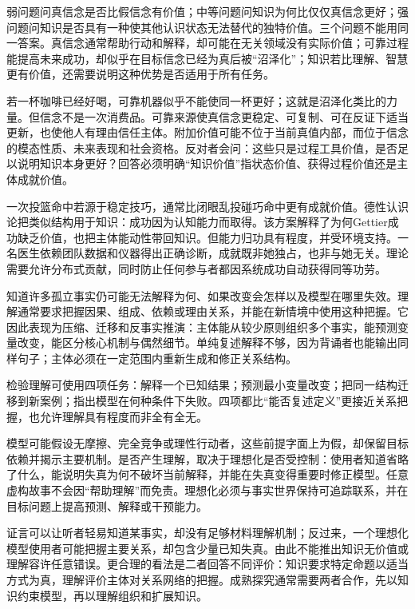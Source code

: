 弱问题问真信念是否比假信念有价值；中等问题问知识为何比仅仅真信念更好；强问题问知识是否具有一种使其他认识状态无法替代的独特价值。三个问题不能用同一答案。真信念通常帮助行动和解释，却可能在无关领域没有实际价值；可靠过程能提高未来成功，却似乎在目标信念已经为真后被“沼泽化”；知识若比理解、智慧更有价值，还需要说明这种优势是否适用于所有任务。

若一杯咖啡已经好喝，可靠机器似乎不能使同一杯更好；这就是沼泽化类比的力量。但信念不是一次消费品。可靠来源使真信念更稳定、可复制、可在反证下适当更新，也使他人有理由信任主体。附加价值可能不位于当前真值内部，而位于信念的模态性质、未来表现和社会资格。反对者会问：这些只是过程工具价值，是否足以说明知识本身更好？回答必须明确“知识价值”指状态价值、获得过程价值还是主体成就价值。

一次投篮命中若源于稳定技巧，通常比闭眼乱投碰巧命中更有成就价值。德性认识论把类似结构用于知识：成功因为认知能力而取得\parencite{sosa2007,zagzebski1996}。该方案解释了为何Gettier成功缺乏价值，也把主体能动性带回知识。但能力归功具有程度，并受环境支持。一名医生依赖团队数据和仪器得出正确诊断，成就既非她独占，也非与她无关。理论需要允许分布式贡献，同时防止任何参与者都因系统成功自动获得同等功劳。

知道许多孤立事实仍可能无法解释为何、如果改变会怎样以及模型在哪里失效。理解通常要求把握因果、组成、依赖或理由关系，并能在新情境中使用这种把握。它因此表现为压缩、迁移和反事实推演：主体能从较少原则组织多个事实，能预测变量改变，能区分核心机制与偶然细节。单纯复述解释不够，因为背诵者也能输出同样句子；主体必须在一定范围内重新生成和修正关系结构。

\begin{argumentbox}
检验理解可使用四项任务：解释一个已知结果；预测最小变量改变；把同一结构迁移到新案例；指出模型在何种条件下失败。四项都比“能否复述定义”更接近关系把握，也允许理解具有程度而非全有全无。
\end{argumentbox}

模型可能假设无摩擦、完全竞争或理性行动者，这些前提字面上为假，却保留目标依赖并揭示主要机制。是否产生理解，取决于理想化是否受控制：使用者知道省略了什么，能说明失真为何不破坏当前解释，并能在失真变得重要时修正模型。任意虚构故事不会因“帮助理解”而免责。理想化必须与事实世界保持可追踪联系，并在目标问题上提高预测、解释或干预能力\parencite{grimm2006}。

证言可以让听者轻易知道某事实，却没有足够材料理解机制；反过来，一个理想化模型使用者可能把握主要关系，却包含少量已知失真。由此不能推出知识无价值或理解容许任意错误。更合理的看法是二者回答不同评价：知识要求特定命题以适当方式为真，理解评价主体对关系网络的把握。成熟探究通常需要两者合作，先以知识约束模型，再以理解组织和扩展知识。

